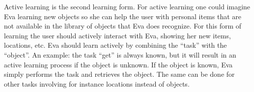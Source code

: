 \documentclass[project_eva.tex]{subfiles}
\begin{document}
\label{sec:Concept}
Active learning is the second learning form. For active learning one could imagine Eva learning new objects so 
she can help the user with personal items that are not available in the library of objects that Eva does recognize. 
For this form of learning the user should actively interact with Eva, showing her new items, locations, etc. Eva should 
learn actively by combining the ``task'' with the ``object''. An example: the task ``get'' is always known, but it will 
result in an active learning process if the object is unknown. If the object is known, Eva simply performs the task and 
retrieves the object. The same can be done for other tasks involving for instance locations instead of objects.
\end{document}

